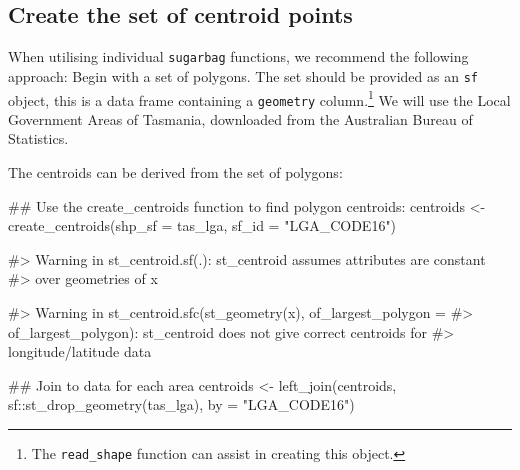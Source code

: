 \hypertarget{create-the-set-of-centroid-points}{%
\subsection{Create the set of centroid
points}\label{create-the-set-of-centroid-points}}

When utilising individual \texttt{sugarbag} functions, we recommend the
following approach: Begin with a set of polygons. The set should be
provided as an \texttt{sf} object, this is a data frame containing a
\texttt{geometry} column.\footnote{The \texttt{read\_shape} function can
  assist in creating this object.} We will use the Local Government
Areas of Tasmania, downloaded from the Australian Bureau of Statistics.

The centroids can be derived from the set of polygons:

\begin{Schunk}
\begin{Sinput}
## Use the create_centroids function to find polygon centroids:
centroids <- create_centroids(shp_sf = tas_lga, sf_id = "LGA_CODE16")
\end{Sinput}
\begin{Soutput}
#> Warning in st_centroid.sf(.): st_centroid assumes attributes are constant
#> over geometries of x
\end{Soutput}
\begin{Soutput}
#> Warning in st_centroid.sfc(st_geometry(x), of_largest_polygon =
#> of_largest_polygon): st_centroid does not give correct centroids for
#> longitude/latitude data
\end{Soutput}
\begin{Sinput}
## Join to data for each area
centroids <- left_join(centroids,
  sf::st_drop_geometry(tas_lga), by = "LGA_CODE16")
\end{Sinput}
\end{Schunk}

